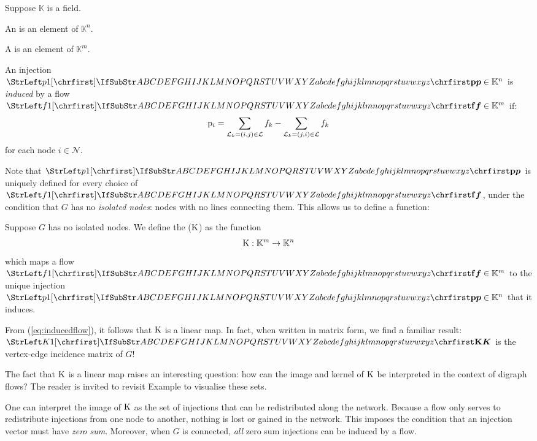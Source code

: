 \documentclass[main.tex]{subfiles}
\begin{document}
Suppose $\mathbb{K}$ is a field.

\begin{definition}
An  is an element of $\mathbb{K}^n$.
\end{definition}
\begin{definition}
A  is an element of $\mathbb{K}^m$.
\end{definition}



\begin{definition}\label{def:inducedinjection}
An injection $\mat{p} \in \mathbb{K}^n$ is \emph{induced} by a flow $\mat{f} \in \mathbb{K}^m$ if:
\begin{gather}
    {\mathrm{p}}_i =
    \sum_{\mathcal{L}_k=(i,j) \in \mathcal{L}} f_k -
    \sum_{\mathcal{L}_k=(j,i) \in \mathcal{L}} f_k \label{eq:inducedflow}
\end{gather}
for each node $i \in \mathcal{N}$.
\end{definition}
Note that $\mat{p}$ is uniquely defined for every choice of $\mat{f}$, under the condition that $G$ has no \emph{isolated nodes}: nodes with no lines connecting them. This allows us to define a function:
\begin{definition}
Suppose $G$ has no isolated nodes. We define the  ($\text{\textup{K}}$) as the function
\begin{gather*}
    \text{\textup{K}}: \mathbb{K}^m \rightarrow \mathbb{K}^n
\end{gather*}
which maps a flow $\mat{f} \in \mathbb{K}^m$ to the unique injection $\mat{p} \in \mathbb{K}^n$ that it induces.
\end{definition}

From (\ref{eq:inducedflow}), it follows that $\text{\textup{K}}$ is a linear map. In fact, when written in matrix form, we find a familiar result: $\mat{K}$ is the vertex-edge incidence matrix of $G$! 

The fact that $\text{\textup{K}}$ is a linear map raises an interesting question: how can the image and kernel of $\text{\textup{K}}$ be interpreted in the context of digraph flows?
The reader is invited to revisit Example  to visualise these sets.

One can interpret the image of $\text{\textup{K}}$ as the set of injections that can be redistributed along the network. Because a flow only serves to redistribute injections from one node to another, nothing is lost or gained in the network. This imposes the condition that an injection vector must have \emph{zero sum}. Moreover, when $G$ is connected, \emph{all} zero sum injections can be induced by a flow.
\end{document}
